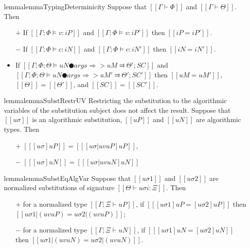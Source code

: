 \begin{restatable}{lemma}{lemmaTypingDeterminicity}
    \label{lemma:typing-determinicity}
    Suppose that $[[Γ ⊢ Φ]]$ and $[[Γ ⊢ Θ]]$. Then 
    \begin{itemize}
        \item [$+$] If $[[Γ; Φ ⊨ v : iP]]$ and $[[Γ; Φ ⊨ v : iP']]$ then $[[iP = iP']]$.
        \item [$-$] If $[[Γ; Φ ⊨ c : iN]]$ and $[[Γ; Φ ⊨ c : iN']]$ then $[[iN = iN']]$.
        \item If $[[Γ; Φ; Θ ⊨ uN ● args ⇒> uM ⫤ Θ'; SC]]$ and 
            $[[Γ; Φ; Θ ⊨ uN ● args ⇒> uM' ⫤ Θ'; SC']]$ then 
            $[[uM = uM']]$, $[[Θ]] = [[Θ']]$, and $[[SC]] =[[SC']]$.  
    \end{itemize}
\end{restatable}

\begin{restatable}{lemma}{lemmaSubstRestrUV}
    \label{lemma:subst-restr-uv}
    Restricting the substitution to the algorithmic 
    variables of the
    substitution subject does not affect the result.
    Suppose that $[[uσ]]$ is an algorithmic substitution,
    $[[uP]]$ and $[[uN]]$ are algorithmic types. Then
 \begin{itemize}
        \item[$+$] $[[ [uσ]uP ]] = [[ [uσ|uv uP]uP ]]$,
        \item[$-$] $[[ [uσ]uN ]] = [[ [uσ|uv uN]uN ]]$
    \end{itemize}
\end{restatable}

\begin{restatable}{lemma}{lemmaSubstEqAlgVar}
    \label{lemma:subst-eq-algovar}
    Suppose that $[[uσ1]]$ and $[[uσ2]]$ are 
    normalized substitutions of signature $[[Θ ⊢ uσi : Ξ]]$.
    Then 
    \begin{enumerate}
        \item [$+$] for a normalized type $[[Γ; Ξ ⊢ uP]]$, if $[[ [uσ1]uP = [uσ2]uP ]]$ then
            $[[uσ1|(uv uP)  = uσ2|(uv uP)]]$;
        \item [$-$] for a normalized type $[[Γ; Ξ ⊢ uN]]$, if $[[ [uσ1]uN = [uσ2]uN ]]$ then
            $[[uσ1|(uv uN)  = uσ2|(uv uN)]]$.
    \end{enumerate}
\end{restatable}


